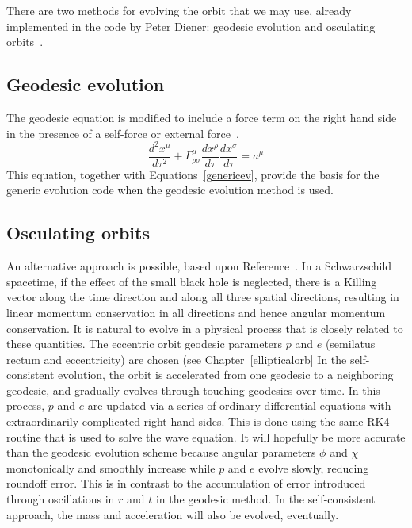 There are two methods for evolving the orbit that we may use, already implemented in the code by Peter Diener: geodesic evolution and osculating orbits~\cite{pound_poisson}.

\subsection{Geodesic evolution}
The geodesic equation is modified to include a force term on the right hand side in the presence of a self-force or external force~\cite{Carroll}.
\begin{equation}
  \frac{d^2x^\mu}{d\tau^2}+\Gamma^\mu_{\rho\sigma}\frac{dx^\rho}{d\tau}\frac{dx^\sigma}{d\tau}=a^\mu
\end{equation}
This equation, together with Equations~\ref{genericev}, provide the basis for the generic evolution code when the geodesic evolution method is used. 

\subsection{Osculating orbits}

An alternative approach is possible, based upon Reference~\cite{pound_poisson}. In a Schwarzschild spacetime, if the effect of the small black hole is neglected, there is a Killing vector along the time direction and along all three spatial directions, resulting in linear momentum conservation in all directions and hence angular momentum conservation. It is natural to evolve in a physical process that is closely related to these quantities. The eccentric orbit geodesic parameters $p$ and $e$ (semilatus rectum and eccentricity) are chosen (see Chapter~\ref{ellipticalorb} In the self-consistent evolution, the orbit is accelerated from one geodesic to a neighboring geodesic, and gradually evolves through touching geodesics over time. In this process, $p$ and $e$ are updated via a series of ordinary differential equations with extraordinarily complicated right hand sides. This is done using the same RK4 routine that is used to solve the wave equation. It will hopefully be more accurate than the geodesic evolution scheme because angular parameters $\phi$ and $\chi$ monotonically and smoothly increase while $p$ and $e$ evolve slowly, reducing roundoff error. This is in contrast to the accumulation of error introduced through oscillations in $r$ and $t$ in the geodesic method. In the self-consistent approach, the mass and acceleration will also be evolved, eventually. 






